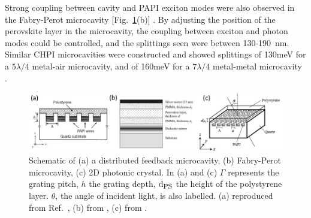 Strong coupling between cavity and PAPI exciton modes were also observed in the Fabry-Perot microcavity [Fig.\ \ref{2Fig20}(b)] \cite{Brehier2006, Lanty2008}. By adjusting the position of the perovskite layer in the microcavity, the coupling between exciton and photon modes could be controlled, and the splittings seen were between 130-190~nm. Similar CHPI microcavities were constructed and showed splittings of 130meV for a $5\lambda/4$ metal-air microcavity, and of 160meV for a $7\lambda/4$ metal-metal microcavity \cite{Pradeesh2009b}.

\begin{figure}[h!]
\centering
\includegraphics[width=\textwidth]{Fig20}
\caption{Schematic of (a) a distributed feedback microcavity, (b) Fabry-Perot microcavity, (c) 2D photonic crystal. In (a) and (c) $\Gamma$ represents the grating pitch, $h$ the grating depth, $\textrm{d}_\textrm{\footnotesize PS}$ the height of the polystyrene layer. $\theta$, the angle of incident light, is also labelled. (a) reproduced from Ref.\ \cite{Fujita1998}, (b) from \cite{Lanty2008}, (c) from \cite{Ishi-Hayase2003}.}
\label{2Fig20}
\end{figure}

